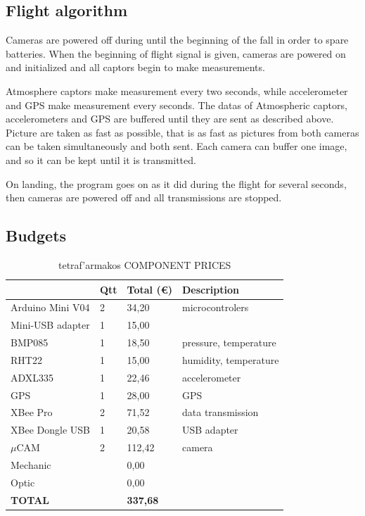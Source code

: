\documentclass[twocolumn,10pt]{article}
\newcommand\tet{\textgreek{tetraf'armakos} }
\begin{document}
    \subsection{Flight algorithm}
    \par Cameras are powered off during until the beginning of the fall in order to spare batteries. When the beginning of flight signal is given, cameras are powered on and initialized and all captors begin to make measurements. 
    \par Atmosphere captors make measurement every two seconds, while accelerometer and GPS make measurement every seconds. The datas of Atmospheric captors, accelerometers and GPS are buffered until they are sent as described above. Picture are taken as fast as possible, that is as fast as pictures from both cameras can be taken simultaneously and both sent. Each camera can buffer one image, and so it can be kept until it is transmitted.
    \par On landing, the program goes on as it did during the flight for several seconds, then cameras are powered off and all transmissions are stopped.
    
    \subsection{Budgets}
    \begin{table}[!h]
    \centering
\begin{tabular}{||l|l|l|l||}
\hline
& Qtt & Total (\euro) & Description \\ \hline
Arduino Mini V04 & 2 & 34,20 & microcontrolers \\ \hline
Mini-USB adapter & 1 & 15,00 &  \\ \hline
BMP085 & 1 & 18,50 & pressure, temperature\\ \hline
RHT22 & 1 & 15,00 & humidity, temperature\\ \hline
ADXL335 & 1 & 22,46 & accelerometer\\ \hline
GPS & 1 & 28,00 & GPS\\ \hline
XBee Pro & 2 & 71,52 & data transmission\\ \hline
XBee Dongle USB & 1 & 20,58 & USB adapter\\ \hline
$\mu$CAM & 2 & 112,42 & camera\\ \hline
Mechanic &  & 0,00 & \\ \hline
Optic &  & 0,00 & \\ \hline \hline
\textbf{TOTAL} &  & \textbf{337,68} & \\ \hline
\end{tabular}
    \caption{\tet COMPONENT PRICES}
\end{table}
\end{document}
